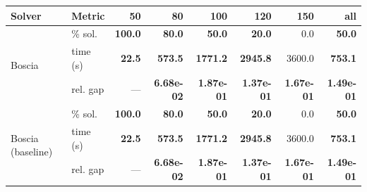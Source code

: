 \begin{tabular}{llrrrrrr}
\toprule
 Solver & Metric & 50 & 80 & 100 & 120 & 150 & all \\
\midrule
\multirow{3}{*}{Boscia} & \% sol. & \textbf{100.0} & \textbf{80.0} & \textbf{50.0} & \textbf{20.0} & 0.0 & \textbf{50.0} \\
  & time (s) & \textbf{22.5} & \textbf{573.5} & \textbf{1771.2} & \textbf{2945.8} & 3600.0 & \textbf{753.1} \\
  & rel. gap & --- & \textbf{6.68e-02} & \textbf{1.87e-01} & \textbf{1.37e-01} & \textbf{1.67e-01} & \textbf{1.49e-01} \\
\midrule
\multirow{3}{*}{Boscia (baseline)} & \% sol. & \textbf{100.0} & \textbf{80.0} & \textbf{50.0} & \textbf{20.0} & 0.0 & \textbf{50.0} \\
  & time (s) & \textbf{22.5} & \textbf{573.5} & \textbf{1771.2} & \textbf{2945.8} & 3600.0 & \textbf{753.1} \\
  & rel. gap & --- & \textbf{6.68e-02} & \textbf{1.87e-01} & \textbf{1.37e-01} & \textbf{1.67e-01} & \textbf{1.49e-01} \\
\bottomrule
\end{tabular}
